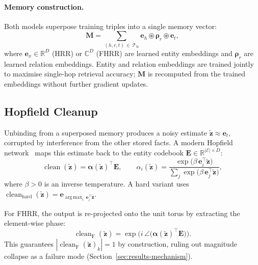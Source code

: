 \documentclass[11pt]{article}
\theoremstyle{definition}
\newcommand{\bind}{\circledast}
\newcommand{\Rb}{\mathbb{R}}
\newcommand{\Cb}{\mathbb{C}}
\newcommand{\ev}[1]{\mathbf{e}_{#1}}
\newcommand{\rv}[1]{\boldsymbol{\rho}_{#1}}
\newcommand{\mem}{\mathbf{M}}
\DeclareMathOperator*{\argmaxop}{arg\,max}
\DeclareMathOperator{\cleanupop}{clean}
\begin{document}
\paragraph{Memory construction.}
Both models superpose training triples into a single memory vector:
\begin{equation}
  \mem = \sum_{(h,r,t)\,\in\,\mathcal{T}_{\mathrm{tr}}} \ev{h} \bind \rv{r} \bind \ev{t},
  \label{eq:memory}
\end{equation}
where $\ev{x} \in \Rb^D$ (HRR) or $\Cb^D$ (FHRR) are learned entity embeddings
and $\rv{r}$ are learned relation embeddings. Entity and relation embeddings are
trained jointly to maximise single-hop retrieval accuracy; $\mem$ is recomputed
from the trained embeddings without further gradient updates.

\subsection{Hopfield Cleanup}
\label{sec:method-cleanup}

Unbinding from a superposed memory produces a noisy estimate
$\tilde{\mathbf{z}} \approx \ev{t}$, corrupted by interference from the other
stored facts. A modern Hopfield network~\cite{ramsauer2021hopfield} maps this
estimate back to the entity codebook $\mathbf{E} \in \Rb^{|\mathcal{E}| \times D}$:
\begin{equation}
  \cleanupop(\tilde{\mathbf{z}})
    = \boldsymbol{\alpha}(\tilde{\mathbf{z}})^\top \mathbf{E},
  \qquad
  \alpha_i(\tilde{\mathbf{z}})
    = \frac{\exp\!\bigl(\beta\,\ev{i}^\top \tilde{\mathbf{z}}\bigr)}
           {\sum_{j} \exp\!\bigl(\beta\,\ev{j}^\top \tilde{\mathbf{z}}\bigr)},
  \label{eq:cleanup}
\end{equation}
where $\beta > 0$ is an inverse temperature. A hard variant uses
$\cleanupop_{\mathrm{hard}}(\tilde{\mathbf{z}}) = \ev{\argmaxop_i\,\ev{i}^\top\tilde{\mathbf{z}}}$.

For FHRR, the output is re-projected onto the unit torus by extracting the
element-wise phase:
\begin{equation}
  \cleanupop_{\mathrm{F}}(\tilde{\mathbf{z}})
    = \exp\!\bigl(i\,\angle\bigl(\boldsymbol{\alpha}(\tilde{\mathbf{z}})^\top \mathbf{E}\bigr)\bigr).
  \label{eq:cleanup-fhrr}
\end{equation}
This guarantees $|\cleanupop_{\mathrm{F}}(\tilde{\mathbf{z}})_k|=1$ by construction,
ruling out magnitude collapse as a failure mode (Section~\ref{sec:results-mechanism}).
\end{document}
